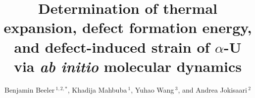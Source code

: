 \documentclass[utf8]{frontiersSCNS} %
\def\firstAuthorLast{Beeler {et~al.}}
\def\Authors{Benjamin Beeler\,$^{1,2,*}$, Khadija Mahbuba\,$^{1}$, Yuhao Wang\,$^{3}$, and Andrea Jokisaari\,$^{2}$}
\begin{document}
\onecolumn
{}

\title[AIMD calculation of temperature-dependent properties of $\alpha$-U]{Determination of thermal expansion, defect formation energy, and defect-induced strain of $\alpha$-U via \textit{ab initio} molecular dynamics} 

\author[\firstAuthorLast ]{\Authors} %
\address{} %
\correspondance{} %

\extraAuth{}%

\maketitle
\end{document}
